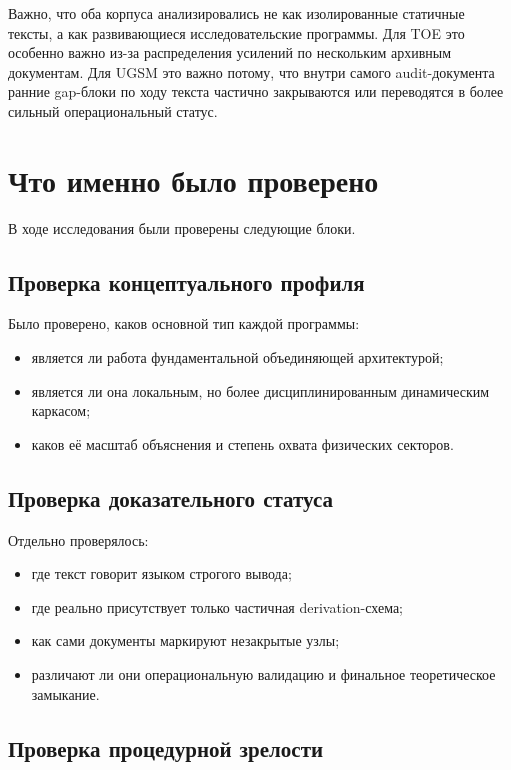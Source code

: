 \documentclass[12pt,a4paper]{article}
\begin{document}
Важно, что оба корпуса анализировались не как изолированные статичные тексты, а как развивающиеся исследовательские программы. Для TOE это особенно важно из-за распределения усилений по нескольким архивным документам. Для UGSM это важно потому, что внутри самого audit-документа ранние gap-блоки по ходу текста частично закрываются или переводятся в более сильный операциональный статус.

\section{Что именно было проверено}

В ходе исследования были проверены следующие блоки.

\subsection{Проверка концептуального профиля}

Было проверено, каков основной тип каждой программы:
\begin{itemize}
    \item является ли работа фундаментальной объединяющей архитектурой;
    \item является ли она локальным, но более дисциплинированным динамическим каркасом;
    \item каков её масштаб объяснения и степень охвата физических секторов.
\end{itemize}

\subsection{Проверка доказательного статуса}

Отдельно проверялось:
\begin{itemize}
    \item где текст говорит языком строгого вывода;
    \item где реально присутствует только частичная derivation-схема;
    \item как сами документы маркируют незакрытые узлы;
    \item различают ли они операциональную валидацию и финальное теоретическое замыкание.
\end{itemize}

\subsection{Проверка процедурной зрелости}
\end{document}
